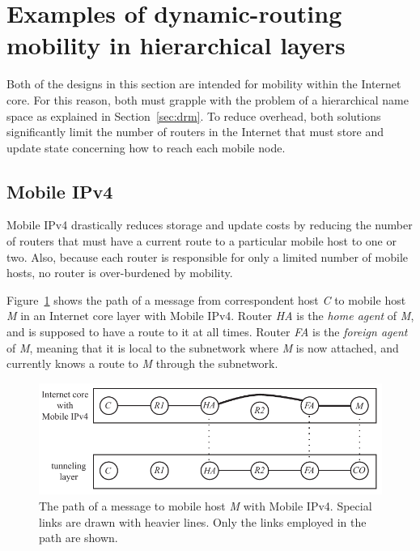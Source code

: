 \section{Examples of dynamic-routing mobility in hierarchical layers}
\label{sec:sec5}

Both of the designs in this section are intended for mobility within
the Internet core.  For this reason, both must grapple with the
problem of a hierarchical name space as explained in
Section~\ref{sec:drm}.
To reduce overhead, both solutions
significantly limit the number of routers in the Internet that must
store and update state concerning how to reach each mobile node.

\subsection{Mobile IPv4}
\label{sec:mipv4}

Mobile IPv4 \cite{mobile-IP,rfc3344} drastically reduces storage and update
costs by reducing the number of routers that must have a current route
to a particular mobile host to one or two.
Also, because each router is responsible for only a limited number of
mobile hosts, no router is over-burdened by mobility.

Figure~\ref{fig:mipv4} shows the path of a message from correspondent
host {\it C}
to mobile host {\it M} in an Internet core layer with Mobile IPv4.
Router {\it HA} is the {\it home agent} of {\it M}, and is supposed to
have a route to it at all times.
Router {\it FA} is the {\it foreign agent} of {\it M}, meaning that
it is local to the subnetwork where {\it M} is now attached,
and currently knows a route to {\it M} through the subnetwork.

\begin{figure}
\centering
\includegraphics[scale=0.90]{figures/mipv4.pdf}
\caption{The path of a message to mobile host {\it M} with Mobile IPv4.
Special links are drawn with heavier lines.
Only the links employed in the path are shown.}
\label{fig:mipv4}
\end{figure}

